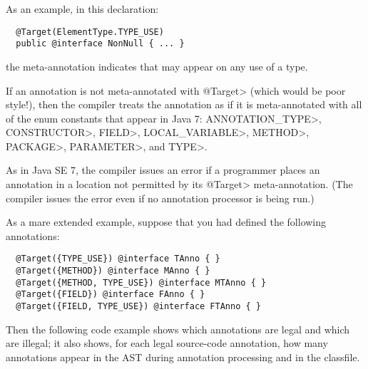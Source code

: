 \documentclass[10pt]{article}
\newcommand{\preverbnegspace}{\vspace{-5pt}}
\begin{document}
As an example, in this declaration:

\preverbnegspace
\begin{Verbatim}
  @Target(ElementType.TYPE_USE)
  public @interface NonNull { ... }
\end{Verbatim}

\noindent
the  meta-annotation indicates that
 may appear on any use of a type.

If an annotation is not meta-annotated with \<@Target> (which would be poor
style!), then the compiler treats the annotation as if it is
meta-annotated with all of the  enum constants
that appear in Java 7: \<ANNOTATION\_TYPE>, \<CONSTRUCTOR>, \<FIELD>,
\<LOCAL\_VARIABLE>, \<METHOD>, \<PACKAGE>, \<PARAMETER>, and \<TYPE>.

As in Java SE 7, the compiler issues an error if a programmer places an
annotation in a location not permitted by its \<@Target> meta-annotation.  (The
compiler issues the error even if no annotation processor is being run.)

As a mare extended example, suppose that you had defined the following annotations:

\begin{Verbatim}
  @Target({TYPE_USE}) @interface TAnno { }
  @Target({METHOD}) @interface MAnno { }
  @Target({METHOD, TYPE_USE}) @interface MTAnno { }
  @Target({FIELD}) @interface FAnno { }
  @Target({FIELD, TYPE_USE}) @interface FTAnno { }
\end{Verbatim}

Then the following code example shows which annotations are legal and which
are illegal; it also shows, for each legal source-code annotation, how many
annotations appear in the AST during annotation processing and in the
classfile.
\end{document}
